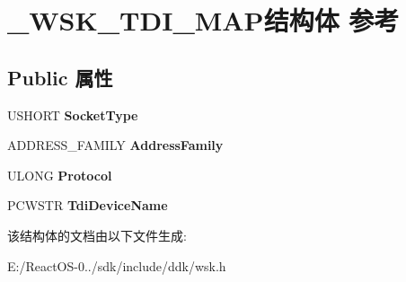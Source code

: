\hypertarget{struct___w_s_k___t_d_i___m_a_p}{}\section{\+\_\+\+W\+S\+K\+\_\+\+T\+D\+I\+\_\+\+M\+A\+P结构体 参考}
\label{struct___w_s_k___t_d_i___m_a_p}
\subsection*{Public 属性}
\begin{DoxyCompactItemize}
\item 
\mbox{\label{struct___w_s_k___t_d_i___m_a_p_abd20390e3c9735431ea806af15874886}} 
U\+S\+H\+O\+RT {\bfseries Socket\+Type}
\item 
\mbox{\label{struct___w_s_k___t_d_i___m_a_p_a9e5faef32aed9883d2cd48c971cd13c2}} 
A\+D\+D\+R\+E\+S\+S\+\_\+\+F\+A\+M\+I\+LY {\bfseries Address\+Family}
\item 
\mbox{\label{struct___w_s_k___t_d_i___m_a_p_af76c6b1ff12deb99c161c8e7122ecc78}} 
U\+L\+O\+NG {\bfseries Protocol}
\item 
\mbox{\label{struct___w_s_k___t_d_i___m_a_p_a316585ea0dcc88e0290d1e7adeaced2c}} 
P\+C\+W\+S\+TR {\bfseries Tdi\+Device\+Name}
\end{DoxyCompactItemize}


该结构体的文档由以下文件生成\+:\begin{DoxyCompactItemize}
\item 
E\+:/\+React\+O\+S-\/0../sdk/include/ddk/wsk.\+h\end{DoxyCompactItemize}
